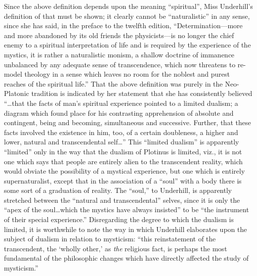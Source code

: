 Since the above definition depends upon the meaning
\enquote{spiritual}, Miss Underhill's definition of that must be
shown; it clearly cannot be \enquote{naturalistic} in any sense, since
she has said, in the preface to the twelfth edition, \enquote{Determination---more
and more abandoned by its old friends the physicists---is
no longer the chief enemy to a spiritual interpretation
of life and is required by the experience of the
mystics, it is rather a naturalistic monism, a shallow
doctrine of immanence unbalanced by any adequate sense of
transcendence, which now threatens to re-model theology in
a sense which leaves no room for the noblest and purest
reaches of the spiritual life.}\supercite{underhill:mysticism}
That the above definition was purely in the Neo-Platonic tradition is indicated by
her statement that she has consistently believed \enquote{\dots that
the facts of man's spiritual experience pointed to a limited
dualism; a diagram which found place for his contrasting
apprehension of absolute and contingent, being and becoming,
simultaneous and successive. Further, that these facts
involved the existence in him, too, of a certain doubleness,
a higher and lower, natural and transcendental self\dots}\supercite{underhill:mysticism}
This \enquote{limited dualism} is apparently \enquote{limited} only in the
way that the dualism of Plotinus is limited, viz., it is not
one which says that people are entirely alien to the transcendent
reality, which would obviate the possibility of a
mystical experience, but one which is entirely supernaturalist,
except that in the association of a \enquote{soul} with a body
there is some sort of a graduation of reality. The \enquote{soul,} to
Underhill, is apparently stretched between the \enquote{natural and
transcendental} selves, since it is only the \enquote{apex of the
soul\dots which the mystics have always insisted} to be \enquote{the
instrument of their special experience.}\supercite{underhill:mysticism}
Disregarding the degree to which the dualism is limited, it is worthwhile to
note the way in which Underhill elaborates upon the subject
of dualism in relation to mysticism: \enquote{this reinstatement of
the transcendent, the \enquote*{wholly other,} as \emph{the} religious fact,
is perhaps the most fundamental of the philosophic changes
which have directly affected the study of mysticism.}\supercite{underhill:mysticism}

